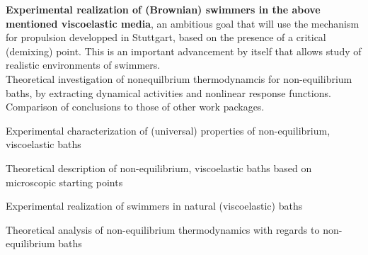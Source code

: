 \begin{workpackage}
\begin{tasklist}
\begin{task}[title=task2,id=brown-t2,PM=24,lead=USTUTT,wphases=24-48!1.0]
{\bf Experimental realization of (Brownian) swimmers in the above mentioned viscoelastic media}, an ambitious goal that will use the mechanism for propulsion developped in Stuttgart, based on the presence of a critical (demixing) point. This is an important advancement by itself that allows study of realistic environments of swimmers.\\
Theoretical investigation of nonequilbrium thermodynamcis for non-equilibrium baths, by extracting dynamical activities and nonlinear response functions. Comparison of conclusions to those of other work packages.
\end{task}

\end{tasklist}

\begin{wpdelivs}
  \begin{wpdeliv}[due=24,id=brown-d1,dissem=PU,nature=DEM,lead=USTUTT]
      {Experimental characterization of (universal) properties of non-equilibrium, viscoelastic baths}
  \end{wpdeliv}
  \begin{wpdeliv}[due=24,id=brown-d2,dissem=PU,nature=DEM,lead=USTUTT]
      {Theoretical description of non-equilibrium, viscoelastic baths based on microscopic starting points}
\end{wpdeliv}
  \begin{wpdeliv}[due=48,id=brown-d3,dissem=PU,nature=DEM,lead=USTUTT]
      {Experimental realization of swimmers in natural (viscoelastic) baths}
\end{wpdeliv}
\begin{wpdeliv}[due=48,id=brown-d4,dissem=PU,nature=DEM,lead=USTUTT]
      {Theoretical analysis of non-equilibrium thermodynamics with regards to non-equilibrium baths}
\end{wpdeliv}
\end{wpdelivs}

\end{workpackage}
